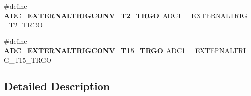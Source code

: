 \begin{DoxyCompactItemize}
\#define {\bfseries A\+D\+C\+\_\+\+E\+X\+T\+E\+R\+N\+A\+L\+T\+R\+I\+G\+C\+O\+N\+V\+\_\+\+T2\+\_\+\+T\+R\+GO}~A\+D\+C1\+\_\+\_\+\+E\+X\+T\+E\+R\+N\+A\+L\+T\+R\+I\+G\+\_\+\+T2\+\_\+\+T\+R\+GO
\item 
\mbox{\label{group___a_d_c___external__trigger__source___regular_ga3c78f17752bc26b7f69139668e4f793b}} 
\#define {\bfseries A\+D\+C\+\_\+\+E\+X\+T\+E\+R\+N\+A\+L\+T\+R\+I\+G\+C\+O\+N\+V\+\_\+\+T15\+\_\+\+T\+R\+GO}~A\+D\+C1\+\_\+\_\+\+E\+X\+T\+E\+R\+N\+A\+L\+T\+R\+I\+G\+\_\+\+T15\+\_\+\+T\+R\+GO
\end{DoxyCompactItemize}


\subsection{Detailed Description}
